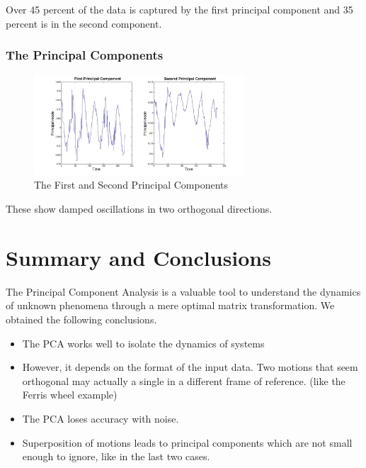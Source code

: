 \documentclass[a4paper]{article}
\begin{document}
Over 45 percent of the data is captured by the first principal component and 35 percent is in the second component. 

\subsubsection{The Principal Components}
\begin{figure}[H] 
	\centering
	\includegraphics[width=0.7\textwidth]{PC4.jpg}
	
	\caption{The First and Second Principal Components}	
\end{figure}
These show damped oscillations in two orthogonal directions.
\section{Summary and Conclusions}
The Principal Component Analysis is a valuable tool to understand the dynamics of unknown phenomena through a mere optimal matrix transformation. We obtained the following conclusions.

\begin{itemize}
\item The PCA works well to isolate the dynamics of systems
\item However, it depends on the format of the input data. Two motions that seem orthogonal may actually a single in a different frame of reference. (like the Ferris wheel example) 
\item The PCA loses accuracy with noise.
\item Superposition of motions leads to principal components which are not small enough to ignore, like in the last two cases.	
\end{itemize}

\newpage

\appendix
\end{document}
